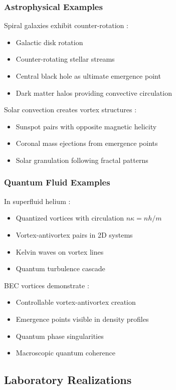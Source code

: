 \documentclass[12pt]{article}
\begin{document}
\subsubsection{Astrophysical Examples}

Spiral galaxies exhibit counter-rotation \cite{rubin1992}:
\begin{itemize}
\item Galactic disk rotation
\item Counter-rotating stellar streams
\item Central black hole as ultimate emergence point
\item Dark matter halos providing convective circulation
\end{itemize}

Solar convection creates vortex structures \cite{miesch2005}:
\begin{itemize}
\item Sunspot pairs with opposite magnetic helicity
\item Coronal mass ejections from emergence points
\item Solar granulation following fractal patterns
\end{itemize}

\subsubsection{Quantum Fluid Examples}

In superfluid helium \cite{donnelly1991}:
\begin{itemize}
\item Quantized vortices with circulation $n\kappa = nh/m$
\item Vortex-antivortex pairs in 2D systems
\item Kelvin waves on vortex lines
\item Quantum turbulence cascade
\end{itemize}

BEC vortices demonstrate \cite{fetter2009}:
\begin{itemize}
\item Controllable vortex-antivortex creation
\item Emergence points visible in density profiles
\item Quantum phase singularities
\item Macroscopic quantum coherence
\end{itemize}

\subsection{Laboratory Realizations}
\end{document}

